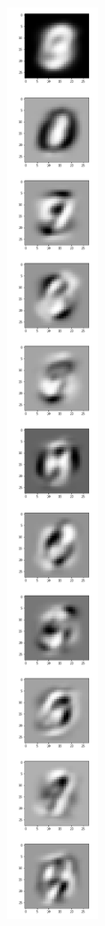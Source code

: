 \documentclass[submit]{harvardml}
\begin{document}
\begin{itemize}
\begin{center}
\includegraphics[scale=0.7]{pcs.png}
\end{center}


\end{itemize}
\end{document}
